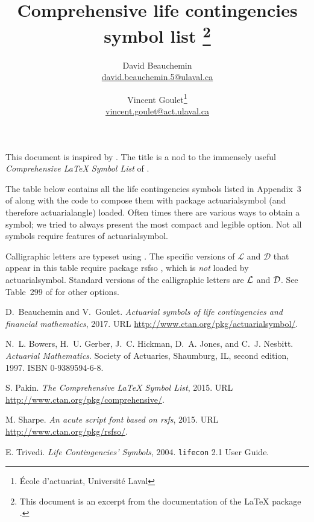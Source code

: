 \documentclass[11pt]{ltxdoc}
\title{Comprehensive life contingencies symbol list%
    \thanks{This document is an excerpt from the documentation of the
      {\LaTeX} package \pkg{actuarialsymbol} \citep{actuarialsymbol}.}}
\author{David Beauchemin \\
    \url{david.beauchemin.5@ulaval.ca}
    \and
    Vincent Goulet\thanks{%
      École d'actuariat, Université Laval} \\
    \url{vincent.goulet@act.ulaval.ca}}
\date{}
\newcommand{\pkg}[1]{\textsf{#1}}
\begin{document}
\maketitle

This document is inspired by \citet{Trivedi:lifecon:2004}. The title
is a nod to the immensely useful \emph{Comprehensive {\LaTeX} Symbol
  List} of \citet{comprehensive}.

The table below contains all the life contingencies symbols listed in
Appendix~3 of \citet{Bowers:2e:1997} along with the code to compose
them with package \pkg{actuarialsymbol} (and therefore
\pkg{actuarialangle}) loaded. Often times there are various ways to
obtain a symbol; we tried to always present the most compact and
legible option. Not all symbols require features of
\pkg{actuarialsymbol}.

Calligraphic letters are typeset using \cmd{\mathcal}. The specific
versions of $\mathcal{L}$ and $\mathcal{D}$ that appear in this
table require package \pkg{rsfso} \citep{rsfso}, which is \emph{not}
loaded by \pkg{actuarialsymbol}. Standard versions of the
calligraphic letters are $\text{\usefont{OMS}{zplm}{m}{n} L}$ and
$\text{\usefont{OMS}{zplm}{m}{n} D}$. See Table~299 of
\citet{comprehensive} for other options.



\begin{thebibliography}{5}
  D.~Beauchemin and V.~Goulet.
  \newblock \emph{Actuarial symbols of life contingencies and financial
    mathematics}, 2017.
  \newblock URL \url{http://www.ctan.org/pkg/actuarialsymbol/}.

  N.~L. Bowers, H.~U. Gerber, J.~C. Hickman, D.~A. Jones, and C.~J. Nesbitt.
  \newblock \emph{Actuarial Mathematics}.
  \newblock Society of Actuaries, Shaumburg, IL, second edition, 1997.
  \newblock ISBN 0-9389594-6-8.

  S. Pakin.
  \newblock \emph{The Comprehensive {\LaTeX} Symbol List}, 2015.
  \newblock URL \url{http://www.ctan.org/pkg/comprehensive/}.

  M. Sharpe.
  \newblock \emph{An acute script font based on {rsfs}}, 2015.
  \newblock URL \url{http://www.ctan.org/pkg/rsfso/}.

  E. Trivedi.
  \newblock \emph{Life Contingencies' Symbols}, 2004.
  \newblock \texttt{lifecon} 2.1 User Guide.
\end{thebibliography}
\end{document}
